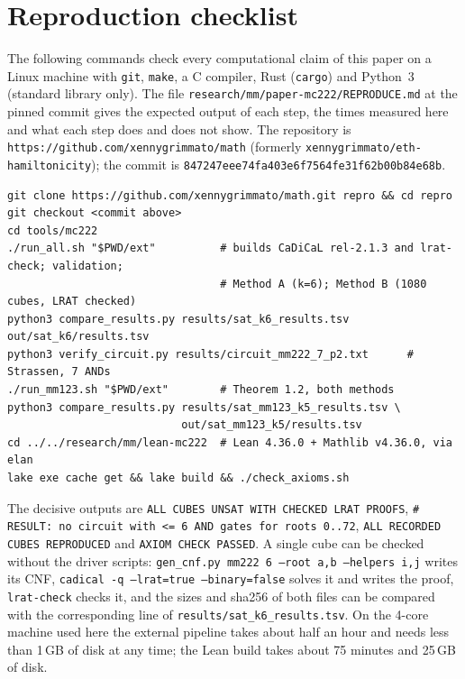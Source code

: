 \documentclass[11pt,a4paper]{article}
\theoremstyle{definition}
\newcommand{\code}[1]{\texttt{#1}}
\newcommand{\commit}{847247eee74fa403e6f7564fe31f62b00b84e68b}
\begin{document}
\appendix
\section{Reproduction checklist}\label{app:repro}

The following commands check every computational claim of this paper on a Linux machine with \code{git}, \code{make}, a C compiler, Rust (\code{cargo}) and Python~3 (standard library only). The file \code{research/mm/paper-mc222/REPRODUCE.md} at the pinned commit gives the expected output of each step, the times measured here and what each step does and does not show. The repository is \code{https://github.com/xennygrimmato/math} (formerly \code{xennygrimmato/eth-hamiltonicity}); the commit is \code{\commit}.
\begin{Verbatim}[fontsize=\footnotesize,frame=single,framesep=2mm]
git clone https://github.com/xennygrimmato/math.git repro && cd repro
git checkout <commit above>
cd tools/mc222
./run_all.sh "$PWD/ext"          # builds CaDiCaL rel-2.1.3 and lrat-check; validation;
                                 # Method A (k=6); Method B (1080 cubes, LRAT checked)
python3 compare_results.py results/sat_k6_results.tsv out/sat_k6/results.tsv
python3 verify_circuit.py results/circuit_mm222_7_p2.txt      # Strassen, 7 ANDs
./run_mm123.sh "$PWD/ext"        # Theorem 1.2, both methods
python3 compare_results.py results/sat_mm123_k5_results.tsv \
                           out/sat_mm123_k5/results.tsv
cd ../../research/mm/lean-mc222  # Lean 4.36.0 + Mathlib v4.36.0, via elan
lake exe cache get && lake build && ./check_axioms.sh
\end{Verbatim}
The decisive outputs are \code{ALL CUBES UNSAT WITH CHECKED LRAT PROOFS}, \code{\# RESULT: no circuit with <= 6 AND gates for roots 0..72}, \code{ALL RECORDED CUBES REPRODUCED} and \code{AXIOM CHECK PASSED}. A single cube can be checked without the driver scripts: \code{gen\_cnf.py mm222 6 --root a,b --helpers i,j} writes its CNF, \code{cadical -q --lrat=true --binary=false} solves it and writes the proof, \code{lrat-check} checks it, and the sizes and sha256 of both files can be compared with the corresponding line of \code{results/sat\_k6\_results.tsv}. On the 4-core machine used here the external pipeline takes about half an hour and needs less than 1\,GB of disk at any time; the Lean build takes about 75 minutes and 25\,GB of disk.


{\footnotesize}
\end{document}
